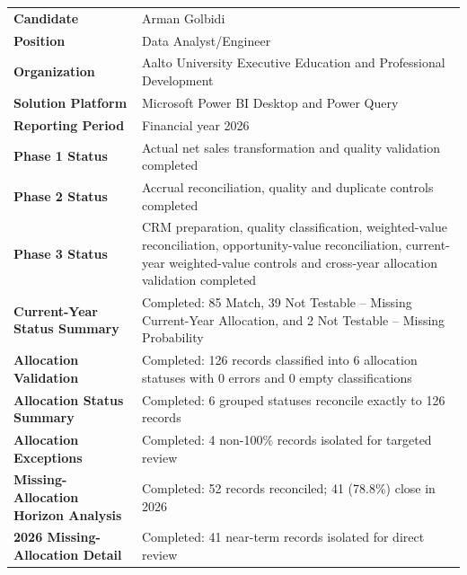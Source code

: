 \documentclass[11pt,a4paper]{article}
\begin{document}
\begin{summarybox}

\begin{tabularx}{\textwidth}{
    >{\bfseries\color{AaltoNavy}}p{4.3cm}
    X
}

Candidate
&
Arman Golbidi
\\

Position
&
Data Analyst/Engineer
\\

Organization
&
Aalto University Executive Education and Professional Development
\\

Solution Platform
&
Microsoft Power BI Desktop and Power Query
\\

Reporting Period
&
Financial year 2026
\\

Phase 1 Status
&
Actual net sales transformation and quality validation completed
\\

Phase 2 Status
&
Accrual reconciliation, quality and duplicate controls completed
\\

Phase 3 Status
&
CRM preparation, quality classification, weighted-value reconciliation,
opportunity-value reconciliation, current-year weighted-value controls and
cross-year allocation validation completed
\\

Current-Year Status Summary
&
Completed: 85 Match, 39 Not Testable -- Missing Current-Year Allocation,
and 2 Not Testable -- Missing Probability
\\

Allocation Validation
&
Completed: 126 records classified into 6 allocation statuses with
0 errors and 0 empty classifications
\\

Allocation Status Summary
&
Completed: 6 grouped statuses reconcile exactly to 126 records
\\

Allocation Exceptions
&
Completed: 4 non-100\% records isolated for targeted review
\\

Missing-Allocation Horizon Analysis
&
Completed: 52 records reconciled; 41 (78.8\%) close in 2026
\\

2026 Missing-Allocation Detail
&
Completed: 41 near-term records isolated for direct review
\\


\end{tabularx}
\end{summarybox}
\end{document}
